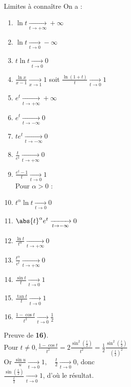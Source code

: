 \documentclass[12pt,a4paper]{report}
\begin{document}
\begin{proposition}{Limites à connaître}{}
On a :
\begin{enumerate}
	\item $\ln t \xrightarrow[t \to +\infty]{} +\infty$
	\item $\ln t \xrightarrow[t \to 0]{} -\infty$
	\item $t \ln t \xrightarrow[t \to 0]{} 0$
	\item $\frac{\ln x}{x-1} \xrightarrow[x \to 1]{} 1$ soit $\frac{\ln(1+t)}{t} \xrightarrow[t \to 0]{} 1$
	\item $e^t \xrightarrow[t \to +\infty]{} +\infty$
	\item $e^t \xrightarrow [t \to -\infty]{} 0$
	\item $te^t \xrightarrow [t \to -\infty]{} 0$
	\item $\frac{t}{e^t} \xrightarrow[t \to +\infty]{} 0$
	\item $\frac{e^t-1}{t} \xrightarrow[t \to 0]{} 1$ \\
	
	Pour $\alpha > 0$ :
	\item $t^\alpha \ln t \xrightarrow[t \to 0]{} 0$
	\item $\abs{t}^\alpha e^t \xrightarrow[t \to -\infty]{} 0$
	\item $\frac{\ln t}{t^\alpha} \xrightarrow[t \to +\infty]{} 0$
	\item $\frac{t^\alpha}{e^t} \xrightarrow[t \to +\infty]{} 0$
	\item $\frac{\sin t}{t} \xrightarrow[t \to 0]{} 1$
	\item $\frac{\tan t}{t} \xrightarrow[t \to 0]{} 1$
	\item $\frac{1-\cos t}{t^2} \xrightarrow[t \to 0]{} \frac{1}{2}$
\end{enumerate}
\end{proposition}

\begin{demo}
Preuve de \textbf{16)}. \\
Pour $t \neq 0, \frac{1-\cos t}{t^2} = 2 \frac{\sin^2\left(\frac{t}{2}\right)}{t^2} = \frac{1}{2} \frac{\sin^2 \left(\frac{t}{2}\right)}{\left(\frac{t}{2}\right)^2}$ \\
Or $\frac{\sin u}{u} \xrightarrow[t \to 0]{} 1, \quad \frac{t}{2} \xrightarrow[t \to 0]{} 0$, \quad donc \\
$\frac{\sin\left(\frac{t}{2}\right)}{\frac{t}{2}} \xrightarrow[t \to 0]{} 1$, d'où le résultat.
\end{demo}
\end{document}
